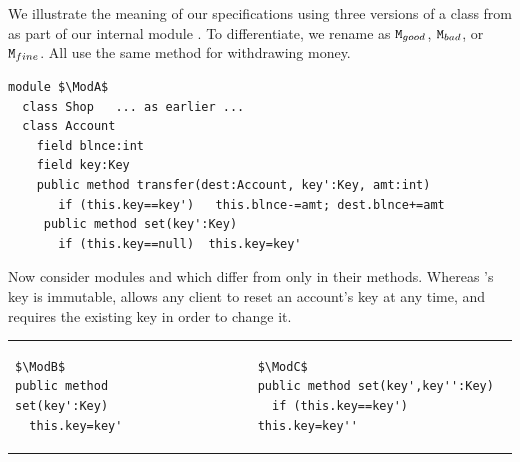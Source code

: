 \begin{example}
We illustrate the meaning of our specifications  using three  versions of a class   from  \cite{OOPSLA22} 
as part of our internal module \Mshop. 
To differentiate, we rename \Mshop  as $\mbox{\normalfont{\texttt{M}}}_{{good}}$,  $\mbox{\normalfont{\texttt{M}}}_{{bad}}$, or $\mbox{\normalfont{\texttt{M}}}_{{fine}}$. 
All use the same  method for withdrawing money.
\begin{lstlisting}[mathescape=true, language=Chainmail, frame=lines]
module $\ModA$      
  class Shop   ... as earlier ...
  class Account
    field blnce:int 
    field key:Key
    public method transfer(dest:Account, key':Key, amt:int)
       if (this.key==key')   this.blnce-=amt; dest.blnce+=amt
     public method set(key':Key)
       if (this.key==null)  this.key=key'
\end{lstlisting}

Now consider  modules \ModB and \ModC which differ from \ModA only in their  methods. Whereas \ModA 's key is immutable, \ModB allows any client to reset an account's key at any time, and \ModC requires the existing key in order to change it.
  

\begin{tabular}{lll}
\begin{minipage}[b]{0.40\textwidth}

\begin{lstlisting}[mathescape=true, language=Chainmail, frame=lines]
$\ModB$
public method set(key':Key)
  this.key=key'
\end{lstlisting}
\end{minipage}
&\ \ \  \ \   &%
\begin{minipage}[b]{0.48\textwidth}
\begin{lstlisting}[mathescape=true, language=chainmail, frame=lines]
$\ModC$
public method set(key',key'':Key)
  if (this.key==key')  this.key=key''
\end{lstlisting}
\end{minipage} 
\end{tabular}


\end{example}
